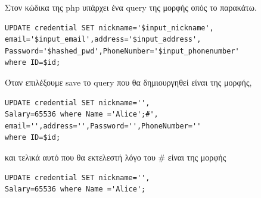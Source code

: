 \noindent
Στον κώδικα της php υπάρχει ένα query της μορφής οπός το παρακάτω.

\begin{center}
	\begin{lstlisting}
UPDATE credential SET nickname='$input_nickname',
email='$input_email',address='$input_address',
Password='$hashed_pwd',PhoneNumber='$input_phonenumber' 
where ID=$id;
	\end{lstlisting}	
\end{center}

Όταν επιλέξουμε save το query που θα δημιουργηθεί είναι της μορφής,

\begin{center}
	\begin{lstlisting}
UPDATE credential SET nickname='',
Salary=65536 where Name ='Alice';#',
email='',address='',Password='',PhoneNumber='' 
where ID=$id;
	\end{lstlisting}	
\end{center}
\newpage
\noindent
και τελικά αυτό που θα εκτελεστή λόγο του \# είναι της μορφής

\begin{center}
	\begin{lstlisting}
UPDATE credential SET nickname='',
Salary=65536 where Name ='Alice';
	\end{lstlisting}	
\end{center}

